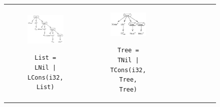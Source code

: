 \begin{figure}[t]
\begin{tabular}{ccc}
\begin{subfigure}[b]{0.32\textwidth}
\begin{center}
{\includegraphics[scale=0.8]{figParseTreeList3.pdf}}
\end{center}
\caption{\label{fig:listParseTree}{\small\tt List = LNil | \newline LCons(i32, List)}}
\end{subfigure}%
&
\begin{subfigure}[b]{0.22\textwidth}
\begin{center}
{\includegraphics[scale=0.78]{figParseTreeTree2.pdf}}
\vspace{10px}
\end{center}
\caption{\label{fig:treeParseTree}{\footnotesize\tt Tree = TNil | \newline TCons(i32, Tree, Tree)}}
\end{subfigure}%
&
\begin{subfigure}[b]{0.4\textwidth}
\begin{center}
{\includegraphics[scale=0.78]{figParseTreeMatrix2.pdf}}

\end{center}
\end{subfigure}
\end{tabular}
\end{figure}
